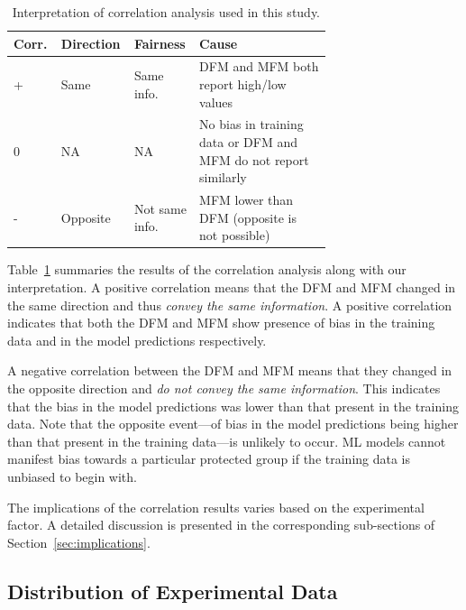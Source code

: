 \documentclass[conference]{IEEEtran}
\begin{document}
\begin{table}
\centering
\caption{Interpretation of correlation analysis used in this study.}
\begin{tabular}{p{0.1\linewidth} p{0.1\linewidth} p{0.1\linewidth} p{0.4\linewidth}}
\hline
\textbf{Corr.} &
\textbf{Direction} &
\textbf{Fairness} &
\textbf{Cause}\\
\hline
+ &
Same &
Same info. &
DFM and MFM both report high/low values\\
  0 &
  NA &
  NA &
  No bias in training data or DFM and MFM do not report similarly\\
  - &
  Opposite &
  Not same info. &
  MFM lower than DFM (opposite is not possible)\\
\hline
\end{tabular}
\label{tab:corr-summary}
\end{table}

Table~\ref{tab:corr-summary} summaries the results of the correlation
analysis along with our interpretation. A positive correlation means
that the DFM and MFM changed in the same direction and thus \emph{convey
the same information}. A positive correlation indicates that both the
DFM and MFM show presence of bias in the training data and in the model
predictions respectively.

A negative correlation between the DFM and MFM means that they changed
in the opposite direction and \emph{do not convey the same
information}. This indicates that the bias in the model predictions
was lower than that present in the training data. Note that the
opposite event---of bias in the model predictions being higher than
that present in the training data---is unlikely to occur. ML models
cannot manifest bias towards a particular protected group if the
training data is unbiased to begin with.

The implications of the correlation results varies based on the
experimental factor. A detailed discussion is presented in the
corresponding sub-sections of Section \ref{sec:implications}.

\subsection{Distribution of Experimental Data}\label{sec:data-analysis}
\end{document}
